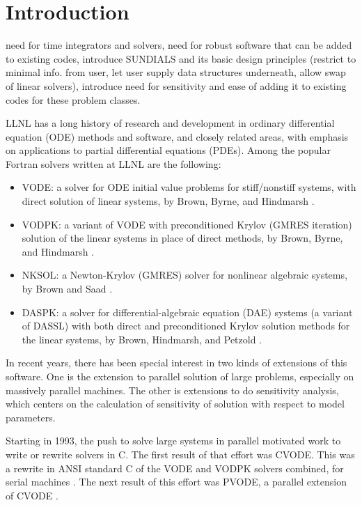\section{Introduction}

{\sf need for time integrators and solvers, need for robust
software that can be added to existing codes, introduce SUNDIALS
and its basic design principles (restrict to minimal info. from
user, let user supply data structures underneath, allow swap of
linear solvers), introduce need for sensitivity and ease of adding
it to existing codes for these problem classes. }

LLNL has a long history of research and development in ordinary
differential equation (ODE) methods and software, and closely related
areas, with emphasis on applications to partial differential equations
(PDEs).  Among the popular Fortran solvers written at LLNL are the
following:
\vspace*{-.19in}
\begin{itemize}

\item VODE: a solver for ODE initial value problems for stiff/nonstiff
systems, with direct solution of linear systems, by Brown, Byrne, and
Hindmarsh \cite{VODE}.

\item VODPK: a variant of VODE with preconditioned Krylov (GMRES
iteration) solution of the linear systems in place of direct methods,
by Brown, Byrne, and Hindmarsh \cite{VODPK}.

\item NKSOL: a Newton-Krylov (GMRES) solver for nonlinear algebraic
systems, by Brown and Saad \cite{NKSOL}.

\item DASPK: a solver for differential-algebraic equation (DAE)
systems (a variant of DASSL) with both direct and preconditioned
Krylov solution methods for the linear systems, by Brown, Hindmarsh,
and Petzold \cite{DASPK}.

\end{itemize}

In recent years, there has been special interest in two kinds of
extensions of this software.  One is the extension to parallel
solution of large problems, especially on massively parallel machines.
The other is extensions to do sensitivity analysis, which centers
on the calculation of sensitivity of solution with respect to model
parameters.

Starting in 1993, the push to solve large systems in parallel
motivated work to write or rewrite solvers in C.  The first result of
that effort was CVODE.  This was a rewrite in ANSI standard C of the
VODE and VODPK solvers combined, for serial machines
\cite{CVUdoc,CVODE}.  The next result of this effort was PVODE, a
parallel extension of CVODE \cite{PVUdoc,PVODE}.

